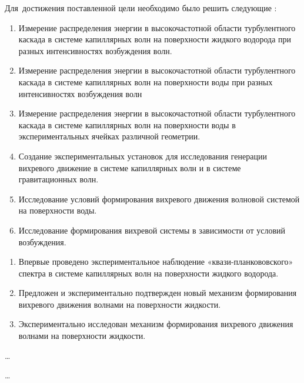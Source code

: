 Для~достижения поставленной цели необходимо было решить следующие {\tasks}:
\begin{enumerate}
	\item Измерение распределения энергии в высокочастотной области турбулентного каскада в системе капиллярных волн на поверхности жидкого водорода при разных интенсивностях возбуждения волн.
	\item Измерение распределения энергии в высокочастотной области турбулентного каскада в системе капиллярных волн на поверхности воды при разных интенсивностях возбуждения волн
	\item Измерение распределения энергии в высокочастотной области турбулентного каскада в системе капиллярных волн на поверхности воды в экспериментальных ячейках различной геометрии.

	\item Создание экспериментальных установок для исследования генерации вихревого движение в системе капиллярных волн и в системе гравитационных волн.
	\item Исследование условий формирования вихревого движения волновой системой на поверхности воды.
	\item Исследование формирования вихревой системы в зависимости от условий возбуждения.
\end{enumerate}

{\novelty}
\begin{enumerate}
	\item Впервые проведено экспериментальное наблюдение «квази-планкововского» спектра в системе капиллярных волн на поверхности жидкого водорода.
	\item Предложен и экспериментально подтвержден новый механизм формирования вихревого движения волнами на поверхности жидкости.
	\item Экспериментально исследован механизм формирования вихревого движения волнами на поверхности жидкости.
	
\end{enumerate}

{\influence} \ldots

{\methods} \ldots


